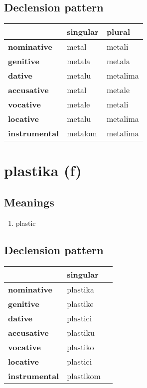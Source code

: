 \subsection*{Declension pattern}
\begin{tabularx}{\linewidth}{Xll}
\toprule
{} & singular &    plural \\
\midrule
\textbf{nominative  } &    metal &    metali \\
\textbf{genitive    } &   metala &    metala \\
\textbf{dative      } &   metalu &  metalima \\
\textbf{accusative  } &    metal &    metale \\
\textbf{vocative    } &   metale &    metali \\
\textbf{locative    } &   metalu &  metalima \\
\textbf{instrumental} &  metalom &  metalima \\
\bottomrule
\end{tabularx}

\filbreak
\section{plastika (f)}
\subsection*{Meanings}
\begin{enumerate}
\item plastic
\end{enumerate}
\subsection*{Declension pattern}
\begin{tabularx}{\linewidth}{Xll}
\toprule
{} &   singular \\
\midrule
\textbf{nominative  } &   plastika \\
\textbf{genitive    } &   plastike \\
\textbf{dative      } &   plastici \\
\textbf{accusative  } &   plastiku \\
\textbf{vocative    } &   plastiko \\
\textbf{locative    } &   plastici \\
\textbf{instrumental} &  plastikom \\
\bottomrule
\end{tabularx}


